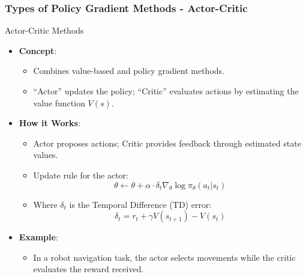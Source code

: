 \documentclass{beamer}
\begin{document}
\begin{frame}[fragile]
    \frametitle{Types of Policy Gradient Methods - Actor-Critic}
    \begin{block}{Actor-Critic Methods}
        \begin{itemize}
            \item \textbf{Concept}:
            \begin{itemize}
                \item Combines value-based and policy gradient methods.
                \item “Actor” updates the policy; “Critic” evaluates actions by estimating the value function \( V(s) \).
            \end{itemize}
            \item \textbf{How it Works}:
            \begin{itemize}
                \item Actor proposes actions; Critic provides feedback through estimated state values.
                \item Update rule for the actor:
                \begin{equation}
                \theta \leftarrow \theta + \alpha \cdot \delta_t \nabla_\theta \log \pi_{\theta}(a_t|s_t)
                \end{equation}
                \item Where \( \delta_t \) is the Temporal Difference (TD) error:
                \begin{equation}
                \delta_t = r_t + \gamma V(s_{t+1}) - V(s_t)
                \end{equation}
            \end{itemize}
            \item \textbf{Example}:
            \begin{itemize}
                \item In a robot navigation task, the actor selects movements while the critic evaluates the reward received.
            \end{itemize}
        \end{itemize}
    \end{block}
\end{frame}
\end{document}
